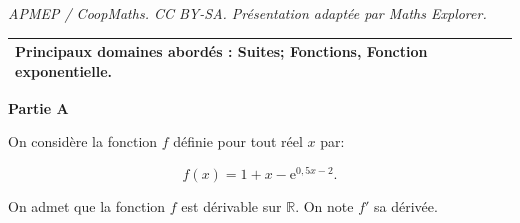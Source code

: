 \documentclass[10pt]{article}
\providecommand{\R}{\mathbb{R}}
\begin{document}
\noindent\textit{APMEP / CoopMaths. CC BY-SA. Présentation adaptée par Maths Explorer.}\par\medskip
\medskip

\begin{tabularx}{\linewidth}{|X|}\hline
\textbf{Principaux domaines abordés :} Suites;
Fonctions, Fonction exponentielle.\\ \hline
\end{tabularx}

\bigskip

\textbf{Partie A}

\medskip

On considère la fonction $f$ définie pour tout réel $x$ par:

\[f(x) = 1+x - \text{e}^{0,5x - 2}.\]

On admet que la fonction $f$ est dérivable sur $\R$. On note $f'$ sa dérivée.

\medskip
\end{document}
